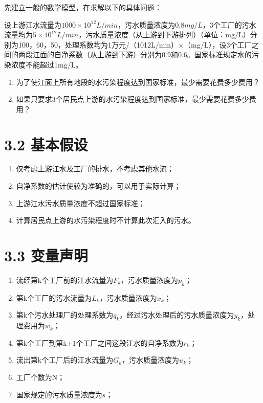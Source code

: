 \documentclass[bachelor,openany,oneside,color]{buaathesis}
\begin{document}
先建立一般的数学模型，在求解以下的具体问题：

设上游江水流量为\(1000×10^{12}L/min\)，污水质量浓度为\(0.8mg/L\)，3个工厂的污水流量均为\(5×10^{12}L/min\)，污水质量浓度（从上游到下游排列）（单位：mg/L）分别为100，60，50，处理系数均为1万元/（1012L/min）×（mg/L），设3个工厂之间的两段江面的自净系数（从上游到下游）分别为0.9和0.6。国家标准规定水的污染浓度不能超过1mg/L。

\begin{enumerate}
\def\labelenumi{\arabic{enumi}.}
\item
  为了使江面上所有地段的水污染程度达到国家标准，最少需要花费多少费用？
\item
  如果只要求3个居民点上游的水污染程度达到国家标准，最少需要花费多少费用？
\end{enumerate}

\hypertarget{header-n243}{%
\section{3.2 基本假设}\label{header-n243}}

\begin{enumerate}
\def\labelenumi{\arabic{enumi}.}
\item
  仅考虑上游江水及工厂的排水，不考虑其他水流；
\item
  自净系数的估计使较为准确的，可以用于实际计算；
\item
  上游江水污水质量浓度不超过国家标准；
\item
  计算居民点上游的水污染程度时不计算此次汇入的污水。
\end{enumerate}

\hypertarget{header-n253}{%
\section{3.3 变量声明}\label{header-n253}}

\begin{enumerate}
\def\labelenumi{\arabic{enumi}.}
\item
  流经第k个工厂前的江水流量为\(F_k\)，污水质量浓度为\(p_k\)；
\item
  第k个工厂的污水流量为\(L_k\)，污水质量浓度为\(x_k\)；
\item
  第k个污水处理厂的处理系数为\(q_k\)，经过污水处理后的污水质量浓度为\(y_k\)，处理费用为\(w_k\)；
\item
  第k个工厂到第k+1个工厂之间这段江水的自净系数为\(r_k\)；
\item
  流出第k个工厂后的江水流量为\(G_k\)，污水质量浓度为\(u_k\)；
\item
  工厂个数为N；
\item
  国家规定的污水质量浓度为\(s\)；
\end{enumerate}
\end{document}
